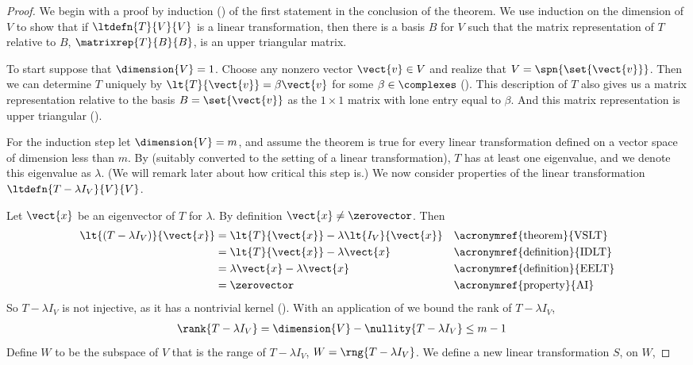 \begin{proof}
We begin with a proof by induction () of the first statement in the conclusion of the theorem.  We use induction on the dimension of $V$ to show that if $\ltdefn{T}{V}{V}$ is a linear transformation,  then there is a basis $B$ for $V$ such that the matrix representation of $T$ relative to $B$, $\matrixrep{T}{B}{B}$, is an upper triangular matrix.\par
%
To start suppose that $\dimension{V}=1$.  Choose any nonzero vector $\vect{v}\in V$ and realize that $V=\spn{\set{\vect{v}}}$.  Then we can determine $T$ uniquely by $\lt{T}{\vect{v}}=\beta\vect{v}$ for some $\beta\in\complexes$ ().  This description of $T$ also gives us a matrix representation relative to the  basis $B=\set{\vect{v}}$ as the $1\times 1$ matrix with lone entry equal to $\beta$.  And this matrix representation is upper triangular ().\par
%
For the induction step let $\dimension{V}=m$, and assume the theorem is true for every linear transformation defined on a vector space of dimension less than $m$.  By  (suitably converted to the setting of a linear transformation), $T$ has at least one eigenvalue, and we denote this eigenvalue as $\lambda$.  (We will remark later about how critical this step is.)  We now consider properties of the linear transformation $\ltdefn{T-\lambda I_V}{V}{V}$.\par
%
Let $\vect{x}$ be an eigenvector of $T$ for $\lambda$.  By definition $\vect{x}\neq\zerovector$.  Then
%
\begin{align*}
\lt{\left(T-\lambda I_V\right)}{\vect{x}}
&=\lt{T}{\vect{x}}-\lambda\lt{I_V}{\vect{x}}
&&\text{\acronymref{theorem}{VSLT}}\\
%
&=\lt{T}{\vect{x}}-\lambda\vect{x}
&&\text{\acronymref{definition}{IDLT}}\\
%
&=\lambda\vect{x}-\lambda\vect{x}
&&\text{\acronymref{definition}{EELT}}\\
%
&=\zerovector
&&\text{\acronymref{property}{AI}}
%
\end{align*}
%
So $T-\lambda I_V$ is not injective, as it has a nontrivial kernel ().  With an application of  we bound the rank of $T-\lambda I_V$,
%
\begin{align*}
\rank{T-\lambda I_V}&=\dimension{V}-\nullity{T-\lambda I_V}\leq m-1
\end{align*}
%
Define $W$ to be the subspace of $V$ that is the range of $T-\lambda I_V$, $W=\rng{T-\lambda I_V}$.   We define a new linear transformation $S$, on $W$,

\end{proof}
